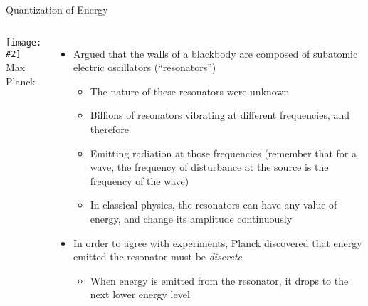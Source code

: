 \documentclass[12pt,compress,aspectratio=169]{beamer}
\newcommand{\pic}[2]{\texttt{[image: \#2]}}
\begin{document}
\begin{frame}{Quantization of Energy}
  \begin{columns}
    \pic{1}{20973-050-F6EEBFF1.jpg}\\
    Max Planck
    
    \begin{itemize}
    \item Argued that the walls of a blackbody are composed of subatomic
      electric oscillators (``resonators'')
      \begin{itemize}
      \item The nature of these resonators were unknown
      \item Billions of resonators vibrating at different frequencies, and
        therefore
      \item Emitting radiation at those frequencies (remember that for a wave,
        the frequency of disturbance at the source is the frequency of the
        wave)
      \item In classical physics, the resonators can have any value of energy,
        and change its amplitude continuously
      \end{itemize}
    \item In order to agree with experiments, Planck discovered that energy
      emitted the resonator must be \emph{discrete}
      \begin{itemize}
      \item When energy is emitted from the resonator, it drops to the next
        lower energy level
      \end{itemize}
    \end{itemize}
  \end{columns}
\end{frame}
\end{document}
